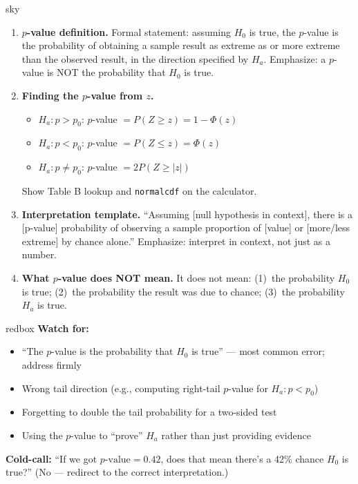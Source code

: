 \documentclass[10pt]{article}
\begin{document}
\begin{skillbox}[Lesson]{sky}
    \begin{enumerate}[leftmargin=1.4em, label=\arabic*.]
        \item \textbf{$p$-value definition.} Formal statement: assuming $H_0$ is true,
              the $p$-value is the probability of obtaining a sample result as extreme as or
              more extreme than the observed result, in the direction specified by $H_a$.
              Emphasize: a $p$-value is NOT the probability that $H_0$ is true.

        \item \textbf{Finding the $p$-value from $z$.}
              \begin{itemize}
                  \item $H_a: p > p_0$: $p$-value $= P(Z \ge z) = 1 - \Phi(z)$
                  \item $H_a: p < p_0$: $p$-value $= P(Z \le z) = \Phi(z)$
                  \item $H_a: p \ne p_0$: $p$-value $= 2P(Z \ge |z|)$
              \end{itemize}
              Show Table B lookup and \texttt{normalcdf} on the calculator.

        \item \textbf{Interpretation template.} ``Assuming [null hypothesis in context], there
              is a [p-value] probability of observing a sample proportion of [value] or
              [more/less extreme] by chance alone.'' Emphasize: interpret in context, not just
              as a number.

        \item \textbf{What $p$-value does NOT mean.} It does not mean: (1)~the probability
              $H_0$ is true; (2)~the probability the result was due to chance; (3)~the
              probability $H_a$ is true.
    \end{enumerate}
\end{skillbox}

\begin{skillbox}{redbox}
    \textbf{Watch for:}
    \begin{itemize}[leftmargin=1.2em]
        \item ``The $p$-value is the probability that $H_0$ is true'' --- most common error; address firmly
        \item Wrong tail direction (e.g., computing right-tail $p$-value for $H_a: p < p_0$)
        \item Forgetting to double the tail probability for a two-sided test
        \item Using the $p$-value to ``prove'' $H_a$ rather than just providing evidence
    \end{itemize}
    \textbf{Cold-call:} ``If we got $p\text{-value} = 0.42$, does that mean there's a 42\% chance
    $H_0$ is true?'' (No --- redirect to the correct interpretation.)
\end{skillbox}
\end{document}
